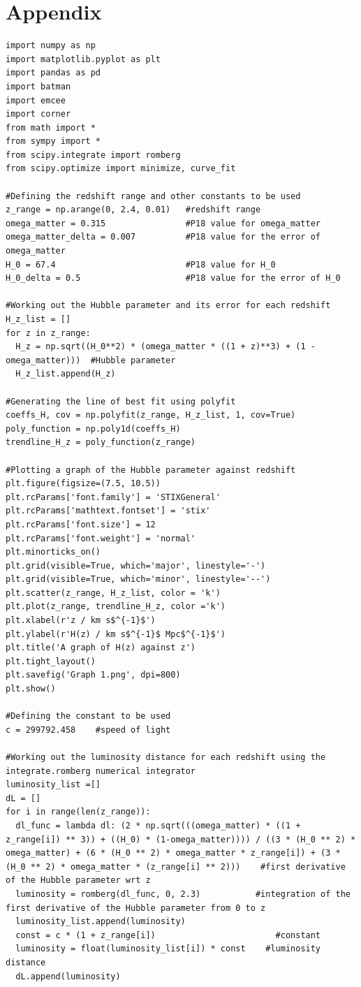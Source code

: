 \documentclass[12pt, a4paper]{article}
\begin{document}
\section{Appendix}
\begin{verbatim}
import numpy as np
import matplotlib.pyplot as plt
import pandas as pd
import batman
import emcee
import corner
from math import *
from sympy import *
from scipy.integrate import romberg
from scipy.optimize import minimize, curve_fit

#Defining the redshift range and other constants to be used
z_range = np.arange(0, 2.4, 0.01)   #redshift range
omega_matter = 0.315                #P18 value for omega_matter
omega_matter_delta = 0.007          #P18 value for the error of omega_matter
H_0 = 67.4                          #P18 value for H_0
H_0_delta = 0.5                     #P18 value for the error of H_0

#Working out the Hubble parameter and its error for each redshift
H_z_list = []
for z in z_range:
  H_z = np.sqrt((H_0**2) * (omega_matter * ((1 + z)**3) + (1 - omega_matter)))  #Hubble parameter
  H_z_list.append(H_z)
  
#Generating the line of best fit using polyfit
coeffs_H, cov = np.polyfit(z_range, H_z_list, 1, cov=True)
poly_function = np.poly1d(coeffs_H)
trendline_H_z = poly_function(z_range)

#Plotting a graph of the Hubble parameter against redshift
plt.figure(figsize=(7.5, 10.5))
plt.rcParams['font.family'] = 'STIXGeneral'
plt.rcParams['mathtext.fontset'] = 'stix'
plt.rcParams['font.size'] = 12
plt.rcParams['font.weight'] = 'normal'
plt.minorticks_on()
plt.grid(visible=True, which='major', linestyle='-')
plt.grid(visible=True, which='minor', linestyle='--')
plt.scatter(z_range, H_z_list, color = 'k')
plt.plot(z_range, trendline_H_z, color ='k')
plt.xlabel(r'z / km s$^{-1}$')
plt.ylabel(r'H(z) / km s$^{-1}$ Mpc$^{-1}$')
plt.title('A graph of H(z) against z')
plt.tight_layout()
plt.savefig('Graph 1.png', dpi=800)
plt.show()

#Defining the constant to be used
c = 299792.458    #speed of light

#Working out the luminosity distance for each redshift using the integrate.romberg numerical integrator
luminosity_list =[]
dL = []
for i in range(len(z_range)):
  dl_func = lambda dl: (2 * np.sqrt(((omega_matter) * ((1 + z_range[i]) ** 3)) + ((H_0) * (1-omega_matter)))) / ((3 * (H_0 ** 2) * omega_matter) + (6 * (H_0 ** 2) * omega_matter * z_range[i]) + (3 * (H_0 ** 2) * omega_matter * (z_range[i] ** 2)))    #first derivative of the Hubble parameter wrt z
  luminosity = romberg(dl_func, 0, 2.3)           #integration of the first derivative of the Hubble parameter from 0 to z
  luminosity_list.append(luminosity)
  const = c * (1 + z_range[i])                        #constant
  luminosity = float(luminosity_list[i]) * const    #luminosity distance
  dL.append(luminosity)


\end{verbatim}
\end{document}
